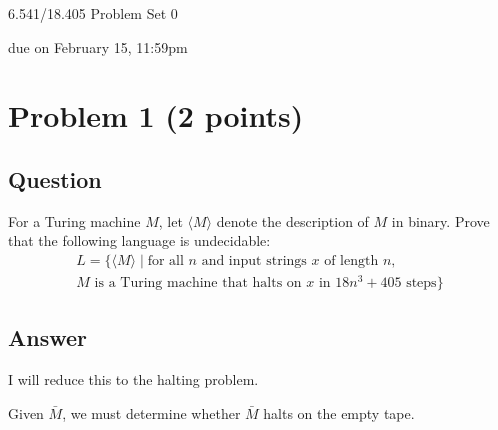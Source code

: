 \documentclass{article}
\begin{document}
	\begin{center}
		\Large
		6.541/18.405 Problem Set 0
		
		\vspace{3pt}
		\normalsize
		due on February 15, 11:59pm
	\end{center}
	
	
	
		
	\section*{Problem 1 (2 points)} 
	\subsection*{Question}
    For a Turing machine $M$, let $\langle M \rangle$ denote the description of $M$ in binary.
    Prove that the following language is undecidable: 
	\begin{multline*}
		L = \{ \langle M\rangle \mid \text{for all $n$ and input strings $x$ of length $n$, } \\
		\text{$M$ is a Turing machine that halts on $x$ in $18n^3+405$ steps} \}
	\end{multline*}

	\subsection*{Answer}

	I will reduce this to the halting problem.

	Given $\bar{M}$, we must determine whether $\bar{M}$ halts on the empty tape.
\end{document}
